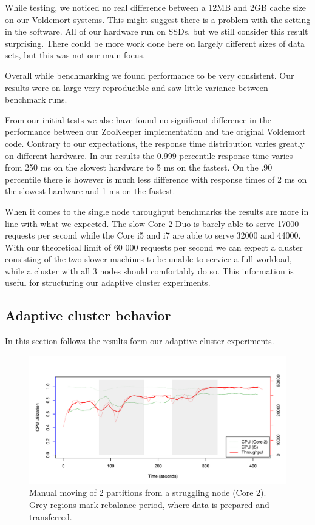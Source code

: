 While testing, we noticed no real difference between a 12MB and 2GB cache size on our Voldemort systems. This might suggest there is a problem with the setting in the software. All of our hardware run on SSDs, but we still consider this result surprising. There could be more work done here on largely different sizes of data sets, but this was not our main focus.

Overall while benchmarking we found performance to be very consistent. Our results were on large very reproducible and saw little variance between benchmark runs.

From our initial tests we alse have found no significant difference in the performance between our ZooKeeper implementation and the original Voldemort code. Contrary to our expectations, the response time distribution varies greatly on different hardware. In our results the 0.999 percentile response time varies from 250 ms on the slowest hardware to 5 ms on the fastest. On the .90 percentile there is however is much less difference with response times of 2 ms on the slowest hardware and 1 ms on the fastest.

When it comes to the single node throughput benchmarks the results are more in line with what we expected. The slow Core 2 Duo is barely able to serve 17000 requests per second while the Core i5 and i7 are able to serve 32000 and 44000. With our theoretical limit of 60 000 requests per second we can expect a cluster consisting of the two slower machines to be unable to service a full workload, while a cluster with all 3 nodes should comfortably do so. This information is useful for structuring our adaptive cluster experiments.

\clearpage
\subsection{Adaptive cluster behavior}
In this section follows the results form our adaptive cluster experiments.

\clearpage
\begin{figure}[h]
    \centering
    \includegraphics[width=1.2\textwidth]{results/rebalance_manual_2node}
    \caption{Manual moving of 2 partitions from a struggling node (Core 2). Grey regions mark rebalance period, where data is prepared and transferred.}
    \label{fig:adaptive_man}
\end{figure}

